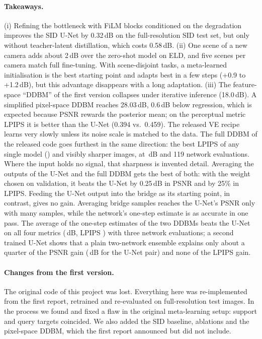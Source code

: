\paragraph{Takeaways.} (i) Refining the bottleneck with FiLM blocks conditioned on the degradation improves the SID U-Net by 0.32\,dB on the full-resolution SID test set, but only without teacher-latent distillation, which costs 0.58\,dB. (ii) One scene of a new camera adds about 2\,dB over the zero-shot model on ELD, and five scenes per camera match full fine-tuning. With scene-disjoint tasks, a meta-learned initialisation is the best starting point and adapts best in a few steps (+0.9 to +1.2\,dB), but this advantage disappears with a long adaptation. (iii) The feature-space ``DDBM'' of the first version collapses under iterative inference (18.0\,dB). A simplified pixel-space DDBM reaches 28.03\,dB, 0.6\,dB below regression, which is expected because PSNR rewards the posterior mean; on the perceptual metric LPIPS it is better than the U-Net (0.394 vs.\ 0.459). The released VE recipe learns very slowly unless its noise scale is matched to the data. The full DDBM of the released code goes furthest in the same direction: the best LPIPS of any single model (\VPFORTYLPIPS{}) and visibly sharper images, at \VPFORTYPSNR\,dB and 119 network evaluations. Where the input holds no signal, that sharpness is invented detail. Averaging the outputs of the U-Net and the full DDBM gets the best of both: with the weight chosen on validation, it beats the U-Net by 0.25\,dB in PSNR and by 25\% in LPIPS. Feeding the U-Net output into the bridge as its starting point, in contrast, gives no gain. Averaging bridge samples reaches the U-Net's PSNR only with many samples, while the network's one-step estimate is as accurate in one pass. The average of the one-step estimates of the two DDBMs beats the U-Net on all four metrics (\STEPAVGPSNR\,dB, LPIPS \STEPAVGLPIPS{}) with three network evaluations; a second trained U-Net shows that a plain two-network ensemble explains only about a quarter of the PSNR gain (\UABPSNR\,dB for the U-Net pair) and none of the LPIPS gain.

\paragraph{Changes from the first version.} The original code of this project was lost. Everything here was re-implemented from the first report, retrained and re-evaluated on full-resolution test images. In the process we found and fixed a flaw in the original meta-learning setup: support and query targets coincided. We also added the SID baseline, ablations and the pixel-space DDBM, which the first report announced but did not include.
